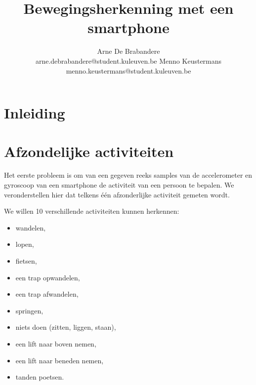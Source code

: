 \documentclass{article}
\title{Bewegingsherkenning met een smartphone}
\author{Arne De Brabandere\\
	arne.debrabandere@student.kuleuven.be
    \And
    Menno Keustermans\\
    menno.keustermans@student.kuleuven.be}
\begin{document}
\maketitle

\begin{abstract}


\end{abstract}

\section{Inleiding}





\section{Afzondelijke activiteiten}

Het eerste probleem is om van een gegeven reeks samples van de accelerometer en gyroscoop van een smartphone de activiteit van een persoon te bepalen. We veronderstellen hier dat telkens \'e\'en afzonderlijke activiteit gemeten wordt.

We willen 10 verschillende activiteiten kunnen herkennen:
\begin{itemize}
\item wandelen,
\item lopen,
\item fietsen,
\item een trap opwandelen,
\item een trap afwandelen,
\item springen,
\item niets doen (zitten, liggen, staan),
\item een lift naar boven nemen, %
\item een lift naar beneden nemen,
\item tanden poetsen.
\end{itemize}
\end{document}
